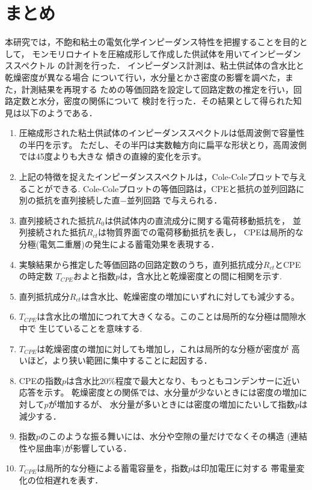 \documentclass{jsce}
\begin{document}
\section{まとめ}
本研究では，不飽和粘土の電気化学インピーダンス特性を把握することを目的として，
モンモリロナイトを圧縮成形して作成した供試体を用いてインピーダンススペクトル
の計測を行った． インピーダンス計測は、粘土供試体の含水比と乾燥密度が異なる場合
について行い，水分量とかさ密度の影響を調べた，また，計測結果を再現する
ための等価回路を設定して回路定数の推定を行い，回路定数と水分，密度の関係について
検討を行った．その結果として得られた知見は以下のようである．
\begin{enumerate}
\item
        圧縮成形された粘土供試体のインピーダンススペクトルは低周波側で容量性の半円を示す。
        ただし、その半円は実数軸方向に扁平な形状とり，高周波側では45度よりも大きな
	傾きの直線的変化を示す。
\item
	上記の特徴を捉えたインピーダンススペクトルは，Cole-Coleプロットで与えることができる.
	Cole-Coleプロットの等価回路は，CPEと抵抗の並列回路に別の抵抗を直列接続した直−並列回路
	で与えられる．
\item
	直列接続された抵抗$R_{0}$は供試体内の直流成分に関する電荷移動抵抗を，
	並列接続された抵抗$R_{ct}$は物質界面での電荷移動抵抗を表し，
	CPEは局所的な分極(電気二重層)の発生による蓄電効果を表現する．
\item
	実験結果から推定した等価回路の回路定数のうち，直列抵抗成分$R_{ct}$とCPEの時定数
	$T_{CPE}$およと指数$p$は，含水比と乾燥密度との間に相関を示す.
\item
        直列抵抗成分$R_{ct}$は含水比、乾燥密度の増加にいずれに対しても減少する。
\item
        $T_{CPE}$は含水比の増加につれて大きくなる。このことは局所的な分極は間隙水中で
	生じていることを意味する.
\item
        $T_{CPE}$は乾燥密度の増加に対しても増加し，これは局所的な分極が密度が
	高いほど，より狭い範囲に集中することに起因する．
\item
        CPEの指数$p$は含水比$20\%$程度で最大となり、もっともコンデンサーに近い応答を示す。
        乾燥密度との関係では、水分量が少ないときには密度の増加に対して$p$が増加するが、
        水分量が多いときには密度の増加にたいして指数$p$は減少する．
\item
        指数$p$のこのような振る舞いには、水分や空隙の量だけでなくその構造
	(連結性や屈曲率)が影響している．
\item
        $T_{CPE}$は局所的な分極による蓄電容量を，指数$p$は印加電圧に対する
	帯電量変化の位相遅れを表す．
\end{enumerate}
\end{document}
